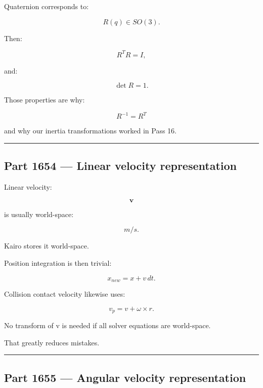 \hypertarget{06-engine-ii-ch037-rotation-matrix-relation}{}

Quaternion corresponds to:

\[
R(q)\in SO(3).
\]

Then:

\[
R^TR=I,
\]

and:

\[
\det R=1.
\]

Those properties are why:

\[
R^{-1}=R^T
\]

and why our inertia transformations worked in Pass 16.

\begin{center}\rule{0.5\linewidth}{0.5pt}\end{center}

\subsection{Part 1654 --- Linear velocity representation}\label{06-engine-ii-ch037-part-1654-linear-velocity-representation}

\hypertarget{06-engine-ii-ch037-part-1654-linear-velocity-representation}{}

Linear velocity:

\[
\mathbf v
\]

is usually world-space:

\[
m/s.
\]

Kairo stores it world-space.

Position integration is then trivial:

\[
x_{new}=x+v\,dt.
\]

Collision contact velocity likewise uses:

\[
v_p
=
v+
\omega\times r.
\]

No transform of v is needed if all solver equations are world-space.

That greatly reduces mistakes.

\begin{center}\rule{0.5\linewidth}{0.5pt}\end{center}

\subsection{Part 1655 --- Angular velocity representation}\label{06-engine-ii-ch037-part-1655-angular-velocity-representation}

\hypertarget{06-engine-ii-ch037-part-1655-angular-velocity-representation}{}

